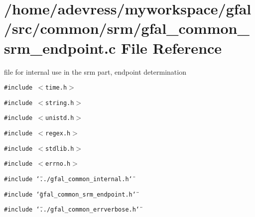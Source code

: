 \section{/home/adevress/myworkspace/gfal/src/common/srm/gfal\_\-common\_\-srm\_\-endpoint.c File Reference}
\label{gfal__common__srm__endpoint_8c}
file for internal use in the srm part, endpoint determination 

{\tt \#include $<$time.h$>$}\par
{\tt \#include $<$string.h$>$}\par
{\tt \#include $<$unistd.h$>$}\par
{\tt \#include $<$regex.h$>$}\par
{\tt \#include $<$stdlib.h$>$}\par
{\tt \#include $<$errno.h$>$}\par
{\tt \#include \char`\"{}../gfal\_\-common\_\-internal.h\char`\"{}}\par
{\tt \#include \char`\"{}gfal\_\-common\_\-srm\_\-endpoint.h\char`\"{}}\par
{\tt \#include \char`\"{}../gfal\_\-common\_\-errverbose.h\char`\"{}}\par
